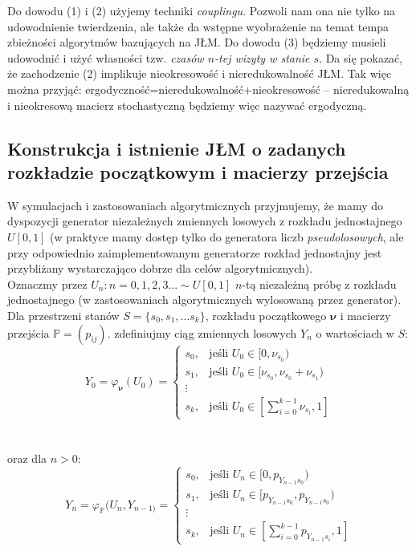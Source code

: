 \documentclass[a4paper]{article}
\theoremstyle{defn}
\theoremstyle{theorem}
\theoremstyle{lemma}
\theoremstyle{cor}
\theoremstyle{fact}
\begin{document}
Do dowodu (1) i (2) użyjemy techniki \textit{couplingu}. Pozwoli nam ona nie tylko na udowodnienie twierdzenia, ale także da wstępne wyobrażenie na temat tempa zbieżności algorytmów bazujących na JŁM. Do dowodu (3) będziemy musieli udowodnić i użyć własności tzw. \textit{czasów $n$-tej wizyty w stanie $s$}. Da się pokazać, że zachodzenie (2) implikuje nieokresowość i nieredukowalność JŁM. Tak więc można przyjąć: ergodyczność=nieredukowalność+nieokresowość – nieredukowalną i nieokresową macierz stochastyczną będziemy więc nazywać ergodyczną.

\subsection{Konstrukcja i istnienie JŁM o zadanych rozkładzie początkowym i macierzy przejścia}
\label{sect2.3}
W symulacjach i zastosowaniach algorytmicznych przyjmujemy, że mamy do dyspozycji generator niezależnych zmiennych losowych z rozkładu jednostajnego $U[0,1]$ (w praktyce mamy dostęp tylko do generatora liczb \textit{pseudolosowych}, ale przy odpowiednio zaimplementowanym generatorze rozkład jednostajny jest przybliżany wystarczająco dobrze dla celów algorytmicznych). \\
Oznaczmy przez $U_n : n = 0,1,2,3... \sim U[0,1]$ $n$-tą niezależną próbę z rozkładu jednostajnego (w zastosowaniach algorytmicznych wylosowaną przez generator). Dla przestrzeni stanów $S = \{s_0, s_1, ... s_k\}$, rozkładu początkowego $\boldsymbol{\nu}$ i macierzy przejścia $\mathbb{P} = (p_{ij})$. zdefiniujmy ciąg zmiennych losowych $Y_n$  o wartościach w $S$:
    $$Y_0 = \varphi_{\boldsymbol{\nu}}(U_0) =
    \begin{cases}
      s_0, & \text{jeśli } U_0 \in [0, \nu_{s_0}) \\
      s_1, & \text{jeśli } U_0 \in [\nu_{s_0}, \nu_{s_0}+\nu_{s_1}) \\
      \vdots \\
      s_k, & \text{jeśli } U_0 \in [\sum\limits_{i=0}^{k-1} \nu_{s_i}, 1]
    \end{cases}$$\\
    \\oraz dla $n > 0$: $$Y_n= \varphi_{\mathbb{P}}(U_n, Y_{n-1)} =
    \begin{cases}
      s_0, & \text{jeśli } U_n \in [0, p_{Y_{n-1} s_0}) \\
      s_1, & \text{jeśli } U_n \in [p_{Y_{n-1} s_0}, p_{Y_{n-1} s_0}) \\
      \vdots \\
      s_k, & \text{jeśli } U_n \in [\sum\limits_{i=0}^{k-1} p_{Y_{n-1} s_i}, 1]
    \end{cases}$$
\end{document}
